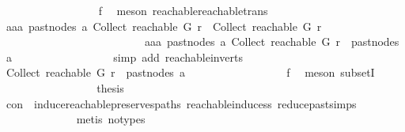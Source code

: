 \begin{isabellebody}
\ \ \ \ \ \ \ \ \ \ \ \ \ \ \ \ \isamarkupfalse%
\ f{}\ \isamarkupfalse%
\ {\isacharparenleft}{\kern0pt}meson\ reachable{}{\isacharunderscore}{\kern0pt}reachable{\isacharunderscore}{\kern0pt}trans{\isacharparenright}{\kern0pt}\isanewline
\ \ \ \ \ \ \ \ \ \ \ \ \ \ \isamarkupfalse%
\ \isamarkupfalse%
\ {\isachardoublequoteopen}aaa\ {\isacharparenleft}{\kern0pt}past{\isacharunderscore}{\kern0pt}nodes\ a{\isacharparenright}{\kern0pt}\ {\isacharparenleft}{\kern0pt}Collect\ {\isacharparenleft}{\kern0pt}reachable\ G\ r{\isacharparenright}{\kern0pt}{\isacharparenright}{\kern0pt}\ {\isasymnotin}\ Collect\ {\isacharparenleft}{\kern0pt}reachable\ G\ r{\isacharparenright}{\kern0pt}\isanewline
\ \ \ \ \ \ \ \ \ \ \ \ \ \ \ \ \ \ \ \ \ \ \ \ \ {\isasymor}\ aaa\ {\isacharparenleft}{\kern0pt}past{\isacharunderscore}{\kern0pt}nodes\ a{\isacharparenright}{\kern0pt}\ {\isacharparenleft}{\kern0pt}Collect\ {\isacharparenleft}{\kern0pt}reachable\ G\ r{\isacharparenright}{\kern0pt}{\isacharparenright}{\kern0pt}\ {\isasymin}\ past{\isacharunderscore}{\kern0pt}nodes\ a{\isachardoublequoteclose}\isanewline
\ \ \ \ \ \ \ \ \ \ \ \ \ \ \ \ \isamarkupfalse%
\ {\isacharparenleft}{\kern0pt}simp\ add{\isacharcolon}{\kern0pt}\ reachable{\isacharunderscore}{\kern0pt}in{\isacharunderscore}{\kern0pt}verts{\isacharparenleft}{\kern0pt}{}{\isacharparenright}{\kern0pt}{\isacharparenright}{\kern0pt}\isanewline
\ \ \ \ \ \ \ \ \ \ \ \ \ \ \isamarkupfalse%
\ \isamarkupfalse%
\ {\isachardoublequoteopen}Collect\ {\isacharparenleft}{\kern0pt}reachable\ G\ r{\isacharparenright}{\kern0pt}\ {\isasymsubseteq}\ past{\isacharunderscore}{\kern0pt}nodes\ a{\isachardoublequoteclose}\isanewline
\ \ \ \ \ \ \ \ \ \ \ \ \ \ \ \ \isamarkupfalse%
\ f{}\ \isamarkupfalse%
\ {\isacharparenleft}{\kern0pt}meson\ subsetI{\isacharparenright}{\kern0pt}\isanewline
\ \ \ \ \ \ \ \ \ \ \ \ \ \ \isamarkupfalse%
\ \isamarkupfalse%
\ {\isacharquery}{\kern0pt}thesis\isanewline
\ \ \ \ \ \ \ \ \ \ \ \ \ \ \ \ \isamarkupfalse%
\ con\ \ induce{\isacharunderscore}{\kern0pt}reachable{\isacharunderscore}{\kern0pt}preserves{\isacharunderscore}{\kern0pt}paths\ reachable{\isacharunderscore}{\kern0pt}induce{\isacharunderscore}{\kern0pt}ss\ reduce{\isacharunderscore}{\kern0pt}past{\isachardot}{\kern0pt}simps\isanewline
\ \ \ \ \ \ \ \ \ \ \ \ \isamarkupfalse%
\ {\isacharparenleft}{\kern0pt}metis\ {\isacharparenleft}{\kern0pt}no{\isacharunderscore}{\kern0pt}types{\isacharparenright}{\kern0pt}{\isacharparenright}{\kern0pt}\isanewline

\end{isabellebody}
